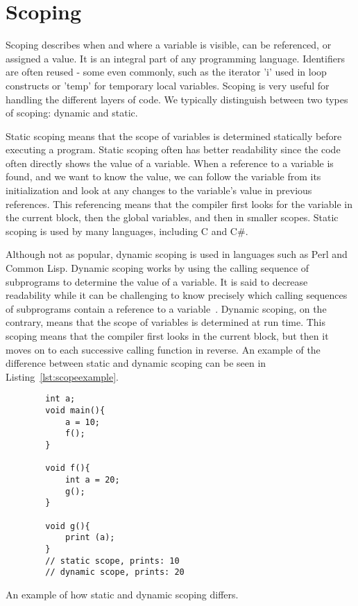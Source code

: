 \section{Scoping}\label{sec:scoping}
Scoping describes when and where a variable is visible, can be referenced, or assigned a value. It is an integral part of any programming language. Identifiers are often reused - some even commonly, such as the iterator 'i' used in loop constructs or 'temp' for temporary local variables. Scoping is very useful for handling the different layers of code. We typically distinguish between two types of scoping: dynamic and static.

Static scoping means that the scope of variables is determined statically before executing a program. Static scoping often has better readability since the code often directly shows the value of a variable. When a reference to a variable is found, and we want to know the value, we can follow the variable from its initialization and look at any changes to the variable's value in previous references. This referencing means that the compiler first looks for the variable in the current block, then the global variables, and then in smaller scopes. Static scoping is used by many languages, including C and C\#.

Although not as popular, dynamic scoping is used in languages such as Perl and Common Lisp. Dynamic scoping works by using the calling sequence of subprograms to determine the value of a variable. It is said to decrease readability while it can be challenging to know precisely which calling sequences of subprograms contain a reference to a variable~\cite{Sebesta2016}. Dynamic scoping, on the contrary, means that the scope of variables is determined at run time. This scoping means that the compiler first looks in the current block, but then it moves on to each successive calling function in reverse. An example of the difference between static and dynamic scoping can be seen in Listing~\ref{lst:scopeexample}.


\begin{listing}[htb!]
    \begin{verbatim}
        int a;
        void main(){
            a = 10;
            f();
        }

        void f(){
            int a = 20;
            g();
        }

        void g(){
            print (a);
        }
        // static scope, prints: 10
        // dynamic scope, prints: 20
    \end{verbatim}
    \caption{An example of how static and dynamic scoping differs.}
    \label{lst:scopeexample}
\end{listing}


